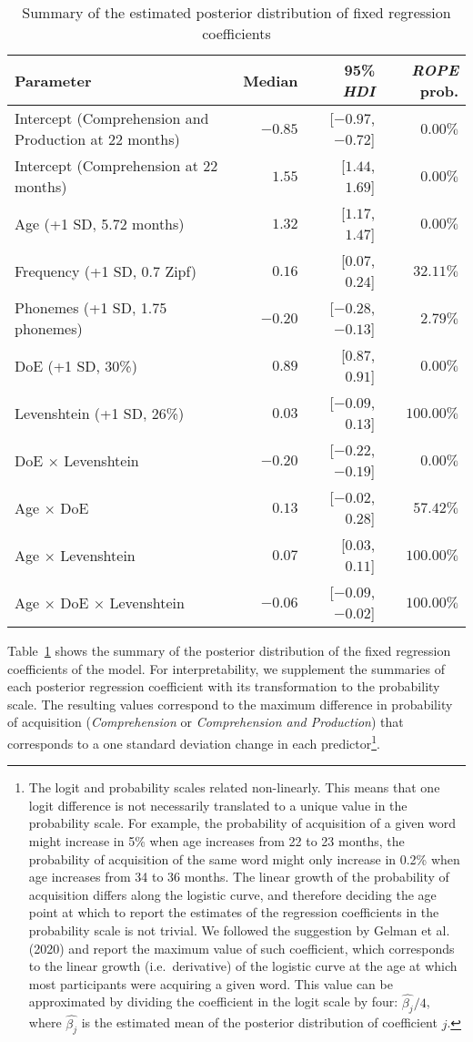 \documentclass[
  letterpaper,
  DIV=11,
  numbers=noendperiod]{scrartcl}
\begin{document}
\hypertarget{tbl-results-fixed}{}
\begin{longtable}{lrrr}
\caption{\label{tbl-results-fixed}Summary of the estimated posterior distribution of fixed regression
coefficients }\tabularnewline

\toprule
Parameter & Median & 95\% \emph{HDI} & \emph{ROPE} prob. \\ 
\midrule
Intercept (Comprehension and Production at 22 months) & $-0.85$ & [$-0.97$, $-0.72$] & $0.00\%$ \\ 
Intercept (Comprehension at 22 months) & $1.55$ & [$1.44$, $1.69$] & $0.00\%$ \\ 
Age (+1 SD, 5.72 months) & $1.32$ & [$1.17$, $1.47$] & $0.00\%$ \\ 
Frequency (+1 SD, 0.7 Zipf) & $0.16$ & [$0.07$, $0.24$] & $32.11\%$ \\ 
Phonemes (+1 SD, 1.75 phonemes) & $-0.20$ & [$-0.28$, $-0.13$] & $2.79\%$ \\ 
DoE (+1 SD, 30\%) & $0.89$ & [$0.87$, $0.91$] & $0.00\%$ \\ 
Levenshtein (+1 SD, 26\%) & $0.03$ & [$-0.09$, $0.13$] & $100.00\%$ \\ 
DoE × Levenshtein & $-0.20$ & [$-0.22$, $-0.19$] & $0.00\%$ \\ 
Age × DoE & $0.13$ & [$-0.02$, $0.28$] & $57.42\%$ \\ 
Age × Levenshtein & $0.07$ & [$0.03$, $0.11$] & $100.00\%$ \\ 
Age × DoE × Levenshtein & $-0.06$ & [$-0.09$, $-0.02$] & $100.00\%$ \\ 
\bottomrule
\end{longtable}

Table~\ref{tbl-results-fixed} shows the summary of the posterior
distribution of the fixed regression coefficients of the model. For
interpretability, we supplement the summaries of each posterior
regression coefficient with its transformation to the probability scale.
The resulting values correspond to the maximum difference in probability
of acquisition (\emph{Comprehension} or \emph{Comprehension and
Production}) that corresponds to a one standard deviation change in each
predictor\footnote{The logit and probability scales related
  non-linearly. This means that one logit difference is not necessarily
  translated to a unique value in the probability scale. For example,
  the probability of acquisition of a given word might increase in 5\%
  when age increases from 22 to 23 months, the probability of
  acquisition of the same word might only increase in 0.2\% when age
  increases from 34 to 36 months. The linear growth of the probability
  of acquisition differs along the logistic curve, and therefore
  deciding the age point at which to report the estimates of the
  regression coefficients in the probability scale is not trivial. We
  followed the suggestion by Gelman et al. (2020) and report the maximum
  value of such coefficient, which corresponds to the linear growth
  (i.e.~derivative) of the logistic curve at the age at which most
  participants were acquiring a given word. This value can be
  approximated by dividing the coefficient in the logit scale by four:
  \(\hat{\beta_j}/4\), where \(\hat{\beta_j}\) is the estimated mean of
  the posterior distribution of coefficient \(j\).}.
\end{document}
